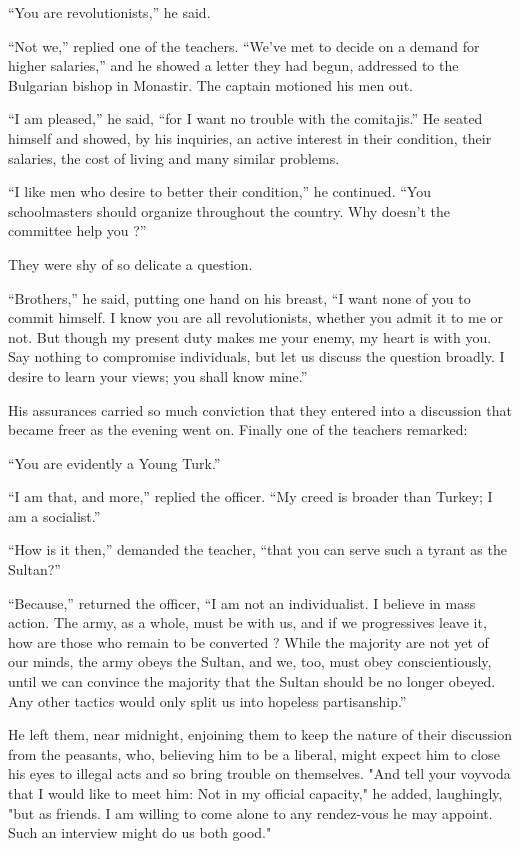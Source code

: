 \documentclass[a5paper,12pt]{book}
\begin{document}
“You are revolutionists,” he said. 

“Not we,” replied one of the teachers. “We’ve met to decide on a demand for higher salaries,” and he showed a letter they had begun, addressed to the Bulgarian bishop in Monastir. The captain motioned his men out. 

“I am pleased,” he said, “for I want no trouble with the comitajis.” He seated himself and showed, by his inquiries, an active interest in their condition, their salaries, the cost of living and many similar problems. 

“I like men who desire to better their condition,” he continued. “You schoolmasters should organize throughout the country. Why doesn’t the committee help you ?” 

They were shy of so delicate a question. 

“Brothers,” he said, putting one hand on his breast, “I want none of you to commit himself. I know you are all revolutionists, whether you admit it to me or not. But though my present duty makes me your enemy, my heart is with you. Say nothing to compromise individuals, but let us discuss the question broadly. I desire to learn your views; you shall know mine.” 

His assurances carried so much conviction that they entered into a discussion that became freer as the evening went on. Finally one of the teachers remarked: 

“You are evidently a Young Turk.” 

“I am that, and more,” replied the officer. “My creed is broader than Turkey; I am a socialist.” 

“How is it then,” demanded the teacher, “that you can serve such a tyrant as the Sultan?” 

“Because,” returned the officer, “I am not an individualist. I believe in mass action. The army, as a whole, must be with us, and if we progressives leave it, how are those who remain to be converted ? While the majority are not yet of our minds, the army obeys the Sultan, and we, too, must obey conscientiously, until we can convince the majority that the Sultan should be no longer obeyed. Any other tactics would only split us into hopeless partisanship.” 

He left them, near midnight, enjoining them to keep the nature of their discussion from the peasants, who, believing him to be a liberal, might expect him to close his eyes to illegal acts and so bring trouble on themselves.
"And tell your voyvoda that I would like to meet him: Not in my official capacity," he added, laughingly, "but as friends. I am willing to come alone to any rendez-vous he may appoint. Such an interview might do us both good."
\end{document}
